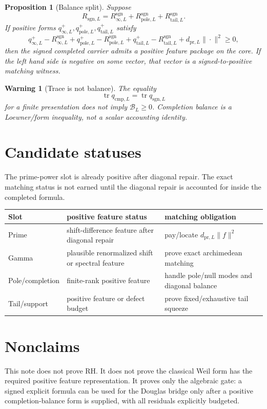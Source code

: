 \documentclass[11pt]{article}
\newtheorem{proposition}[theorem]{Proposition}
\newtheorem{warning}[theorem]{Warning}
\newcommand{\pr}{\mathrm{pr}}
\newcommand{\cmp}{\mathrm{cmp}}
\newcommand{\sgn}{\mathrm{sgn}}
\newcommand{\tail}{\mathrm{tail}}
\newcommand{\pole}{\mathrm{pole}}
\begin{document}
\begin{proposition}[Balance split]
Suppose
\[
    R_{\sgn,L}=R_{\infty,L}^{\sgn}+R_{\pole,L}^{\sgn}+R_{\tail,L}^{\sgn}.
\]
If positive forms \(q^+_{\infty,L},q^+_{\pole,L},q^+_{\tail,L}\) satisfy
\[
    q^+_{\infty,L}-R_{\infty,L}^{\sgn}
    +q^+_{\pole,L}-R_{\pole,L}^{\sgn}
    +q^+_{\tail,L}-R_{\tail,L}^{\sgn}
    +d_{\pr,L}\|\cdot\|^2\ge0,
\]
then the signed completed carrier admits a positive feature package on the core.  If the left hand side is negative on some vector, that vector is a signed-to-positive matching witness.
\end{proposition}

\begin{warning}[Trace is not balance]
The equality
\[
    \operatorname{tr} q_{\cmp,L}=\operatorname{tr}q_{\sgn,L}
\]
for a finite presentation does not imply \(\mathcal B_L\ge0\).  Completion balance is a Loewner/form inequality, not a scalar accounting identity.
\end{warning}

\section{Candidate statuses}
The prime-power slot is already positive after diagonal repair.  The exact matching status is not earned until the diagonal repair is accounted for inside the completed formula.

\begin{center}
\begin{tabular}{lll}
\toprule
Slot & positive feature status & matching obligation\\
\midrule
Prime & shift-difference feature after diagonal repair & pay/locate \(d_{\pr,L}\|f\|^2\)\\
Gamma & plausible renormalized shift or spectral feature & prove exact archimedean matching\\
Pole/completion & finite-rank positive feature & handle pole/null modes and diagonal balance\\
Tail/support & positive feature or defect budget & prove fixed/exhaustive tail squeeze\\
\bottomrule
\end{tabular}
\end{center}

\section{Nonclaims}
This note does not prove RH.  It does not prove the classical Weil form has the required positive feature representation.  It proves only the algebraic gate: a signed explicit formula can be used for the Douglas bridge only after a positive completion-balance form is supplied, with all residuals explicitly budgeted.
\end{document}
